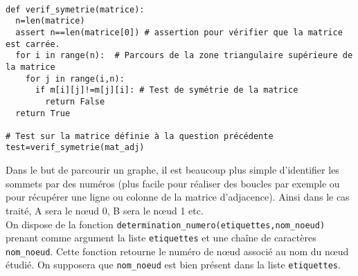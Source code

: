 \ifprof
\begin{corrige}~\\
\begin{lstlisting}
def verif_symetrie(matrice):
  n=len(matrice)
  assert n==len(matrice[0]) # assertion pour vérifier que la matrice est carrée.
  for i in range(n):  # Parcours de la zone triangulaire supérieure de la matrice
    for j in range(i,n): 
      if m[i][j]!=m[j][i]: # Test de symétrie de la matrice
        return False
  return True

# Test sur la matrice définie à la question précédente
test=verif_symetrie(mat_adj)
\end{lstlisting}
\end{corrige}
\else
\fi

%
%
%
%
%
Dans le but de parcourir un graphe, il est beaucoup plus simple d'identifier les sommets par des numéros (plus facile pour réaliser des boucles par exemple ou pour récupérer une ligne ou colonne de la matrice d'adjacence). Ainsi dans le cas traité, A sera le n\oe{}ud 0, B sera le n\oe{}ud 1 etc.\\

On dispose de la fonction \texttt{determination\_numero(etiquettes,nom\_noeud)} prenant comme argument la liste \texttt{etiquettes} et une chaîne de caractères \texttt{nom\_noeud}. Cette fonction retourne le numéro de n\oe{}ud associé au nom du n\oe{}ud étudié. 
On supposera que \texttt{nom\_noeud} est bien présent dans la liste  \texttt{etiquettes}.
%
%

